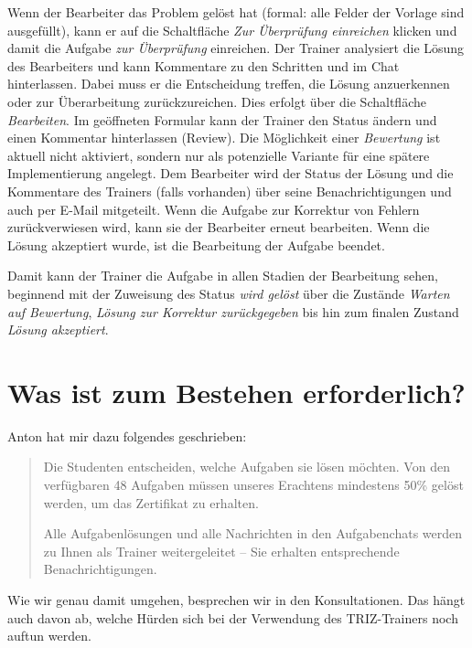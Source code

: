 \documentclass[11pt,a4paper]{article}
\begin{document}
Wenn der Bearbeiter das Problem gelöst hat (formal: alle Felder der Vorlage
sind ausgefüllt), kann er auf die Schaltfläche \emph{Zur Überprüfung
  einreichen} klicken und damit die Aufgabe \emph{zur Überprüfung} einreichen.
Der Trainer analysiert die Lösung des Bearbeiters und kann Kommentare zu den
Schritten und im Chat hinterlassen. Dabei muss er die Entscheidung treffen,
die Lösung anzuerkennen oder zur Überarbeitung zurückzureichen. Dies erfolgt
über die Schaltfläche \emph{Bearbeiten}. Im geöffneten Formular kann der
Trainer den Status ändern und einen Kommentar hinterlassen (Review).  Die
Möglichkeit einer \emph{Bewertung} ist aktuell nicht aktiviert, sondern nur
als potenzielle Variante für eine spätere Implementierung angelegt. Dem
Bearbeiter wird der Status der Lösung und die Kommentare des Trainers (falls
vorhanden) über seine Benachrichtigungen und auch per E-Mail mitgeteilt.  Wenn
die Aufgabe zur Korrektur von Fehlern zurückverwiesen wird, kann sie der
Bearbeiter erneut bearbeiten. Wenn die Lösung akzeptiert wurde, ist die
Bearbeitung der Aufgabe beendet.

Damit kann der Trainer die Aufgabe in allen Stadien der Bearbeitung sehen,
beginnend mit der Zuweisung des Status \emph{wird gelöst} über die Zustände
\emph{Warten auf Bewertung}, \emph{Lösung zur Korrektur zurückgegeben} bis hin
zum finalen Zustand \emph{Lösung akzeptiert}.

\section{Was ist zum Bestehen erforderlich?}

Anton hat mir dazu folgendes geschrieben:
\begin{quote}
  Die Studenten entscheiden, welche Aufgaben sie lösen möchten. Von den
  verfüg\-baren 48 Aufgaben müssen unseres Erachtens mindestens 50\% gelöst
  werden, um das Zertifikat zu erhalten.
  
  Alle Aufgabenlösungen und alle Nachrichten in den Aufgabenchats werden zu
  Ihnen als Trainer weitergeleitet -- Sie erhalten entsprechende
  Benachrichtigungen.
\end{quote}

Wie wir genau damit umgehen, besprechen wir in den Konsultationen. Das hängt
auch davon ab, welche Hürden sich bei der Verwendung des TRIZ-Trainers noch
auftun werden. 
\end{document}
